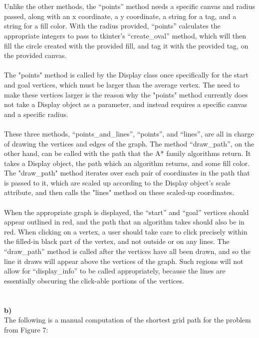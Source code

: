 \documentclass[12pt]{article}
\begin{document}
{\\
\\
Unlike the other methods, the “points” method needs a specific canvas and radius passed, along with an x coordinate, a y coordinate, a string for a tag, and a string for a fill color. With the radius provided, “points” calculates the appropriate integers to pass to tkinter’s “create\_oval” method, which will then fill the circle created with the provided fill, and tag it with the provided tag, on the provided canvas.
\\
\\
The "points" method is called by the Display class once specifically for the start and goal vertices, which must be larger than the average vertex. The need to make these vertices larger is the reason why the "points" method currently does not take a Display object as a parameter, and instead requires a specific canvas and a specific radius.
\\
\\
These three methods, “points\_and\_lines”, “points”, and “lines”, are all in charge of drawing the vertices and edges of the graph. The method “draw\_path”, on the other hand, can be called with the path that the A* family algorithms return. It takes a Display object, the path which an algorithm returns, and some fill color. The "draw\_path" method iterates over each pair of coordinates in the path that is passed to it, which are scaled up according to the Display object's scale attribute, and then calls the "lines" method on these scaled-up coordinates.
\\
\\
When the appropriate graph is displayed, the “start” and “goal” vertices should appear outlined in red, and the path that an algorithm takes should also be in red. When clicking on a vertex, a user should take care to click precisely within the filled-in black part of the vertex, and not outside or on any lines. The “draw\_path” method is called after the vertices have all been drawn, and so the line it draws will appear above the vertices of the graph. Such regions will not allow for “display\_info” to be called appropriately, because the lines are essentially obscuring the click-able portions of the vertices. 
\\
\\
\\
{\bf b)}
\\
The following is a manual computation of the shortest grid path for the problem from Figure 7:
\\
}
\end{document}
